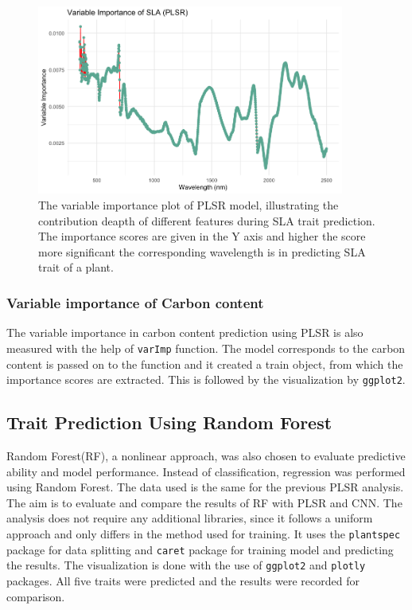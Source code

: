 \documentclass[12pt,a4paper]{report}
\begin{document}
\begin{figure}[h]
    \centering
    \includegraphics[width=0.9\textwidth]{Figures/vi_sla_plsr.png}
    \caption{The variable importance plot of PLSR model, illustrating the contribution deapth of different features during SLA trait prediction. The importance scores are given in the Y axis and higher the score more significant the corresponding wavelength is in predicting SLA trait of a plant. }
    \label{fig:vi_sla_plsr}
\end{figure}

\subsubsection*{Variable importance of Carbon content}
The variable importance in carbon content prediction using PLSR is also measured with the help of \texttt{varImp} function. The model corresponds to the carbon content is passed on to the function and it created a train object, from which the importance scores are extracted. This is followed by the visualization by \texttt{ggplot2}.\\


\subsection{Trait Prediction Using Random Forest}
Random Forest(RF), a nonlinear approach, was also chosen to evaluate predictive ability and model performance. Instead of classification, regression was performed using Random Forest. The data used is the same for the previous PLSR analysis. The aim is to evaluate and compare the results of RF with PLSR and CNN. The analysis does not require any additional libraries, since it follows a uniform approach and only differs in the method used for training. It uses the \texttt{plantspec} package for data splitting and \texttt{caret} package for training model and predicting the results. The visualization is done with the use of \texttt{ggplot2} and \texttt{plotly} packages. All five traits were predicted and the results were recorded for comparison.\\
\end{document}
